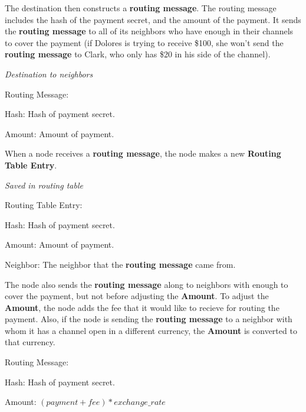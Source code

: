 \documentclass[a4paper]{article}
\newcommand{\bgls}[1]{\textbf{\gls{#1}}}
\newenvironment{mydescription}
{\begin{description}
\setlength{\itemsep}{5pt}
  \setlength{\parskip}{0pt}
  \setlength{\labelsep}{5pt}
}{
\end{description}}
\begin{document}
The destination then constructs a \bgls{routing message}. The routing message includes the hash of the payment secret, and the amount of the payment. It sends the \bgls{routing message} to all of its neighbors who have enough in their channels to cover the payment (if Dolores is trying to receive \$100, she won't send the \bgls{routing message} to Clark, who only has \$20 in his side of the channel).

\begin{mdframed}[style=message]{\emph{Destination to neighbors}}
\begin{mydescription}
\item[Routing Message:] \hfill
\begin{mydescription}
  \item[Hash:] Hash of payment secret.
  \item[Amount:] Amount of payment.
\end{mydescription}
\end{mydescription}
\end{mdframed}

When a node receives a \bgls{routing message}, the node makes a new \textbf{Routing Table Entry}.

\begin{mdframed}[style=message]{\emph{Saved in routing table}}
\begin{mydescription}
\item[Routing Table Entry:] \hfill
\begin{mydescription}
  \item[Hash:] Hash of payment secret.
  \item[Amount:] Amount of payment.
  \item[Neighbor:] The neighbor that the \bgls{routing message} came from.
\end{mydescription}
\end{mydescription}
\end{mdframed}

The node also sends the \bgls{routing message} along to neighbors with enough to cover the payment, but not before adjusting the \textbf{Amount}. To adjust the \textbf{Amount}, the node adds the fee that it would like to recieve for routing the payment. Also, if the node is sending the \bgls{routing message} to a neighbor with whom it has a channel open in a different currency, the \textbf{Amount} is converted to that currency.

\begin{mdframed}[style=message]
\begin{mydescription}
\item[Routing Message:] \hfill
\begin{mydescription}
  \item[Hash:] Hash of payment secret.
  \item[Amount:]   $(payment + fee) * exchange\_rate$
\end{mydescription}
\end{mydescription}
\end{mdframed}
\end{document}
